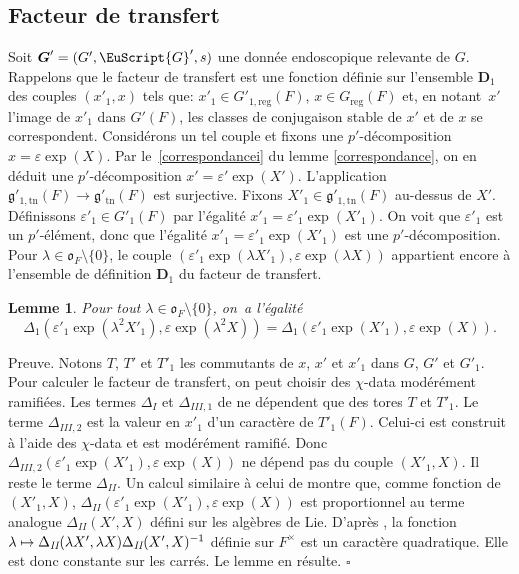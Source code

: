 \documentclass[JEP,XML,SOM,Unicode,francais]{cedram}
\let\mathcal \EuScript
\let\epsilon\varepsilon
\newcommand\mto{\mathchoice{\longmapsto}{\mapsto}{\mapsto}{\mapsto}}
\newcommand{\frg}{\mathfrak{g}}
\newcommand{\fro}{\mathfrak{o}}
\newcommand{\reg}{\mathrm{reg}}
\newcommand{\tn}{\mathrm{tn}}
\newcommand{\bD}{\boldsymbol{D}}
\newcommand{\bG}{\boldsymbol{G}}
\newcommand{\cG}{\mathcal{G}}
\theoremstyle{plain}
\newtheorem*{lem*}{Lemme}
\theoremstyle{definition}
\begin{document}
\subsection{Facteur de transfert}\label{facteurdetransfert}
Soit $\bG'=(G',\cG',s)$ une donnée endoscopique relevante de $G$. Rappelons que le facteur de transfert est une fonction définie sur l'ensemble $\bD_{1}$ des couples $(x'_{1},x)$ tels que: $x'_{1}\in G'_{1,\reg}(F)$, $x\in G_{\reg}(F)$ et, en notant~$x'$ l'image de $x'_{1}$ dans $G'(F)$, les classes de conjugaison stable de $x'$ et de $x$ se correspondent. Considérons un tel couple et fixons une
$p'$-décomposition $x=\epsilon \exp(X)$. Par le~\eqref{correspondancei} du
lemme \ref{correspondance}, on en déduit une $p'$-décomposition $x'=\epsilon' \exp(X')$. L'application $\frg'_{1,\tn}(F)\to \frg'_{\tn}(F)$ est surjective. Fixons $X'_{1}\in \frg'_{1,\tn}(F)$ au-dessus de $X'$. Définissons $\epsilon'_{1}\in G'_{1}(F)$ par l'égalité $x'_{1}=\epsilon'_{1}\exp(X'_{1})$. On voit que $\epsilon'_{1}$ est un $p'$-élément, donc que l'égalité $x'_{1}=\epsilon'_{1}\exp(X'_{1})$ est une $p'$-décomposition. Pour $\lambda\in \fro_{F}\setminus\{0\}$, le couple $(\epsilon'_{1}\exp(\lambda X'_{1}),\epsilon \exp(\lambda X))$ appartient encore à l'ensemble de définition $\bD_{1}$ du facteur de transfert.

\begin{lem*}
Pour tout $\lambda\in \fro_{F}\setminus\{0\}$, on~a l'égalité
\[
\Delta_{1}(\epsilon'_{1}\exp(\lambda^2 X'_{1}),\epsilon \exp(\lambda^2 X))=\Delta_{1}(\epsilon'_{1}\exp( X'_{1}),\epsilon \exp( X)).
\]
\end{lem*}

Preuve. Notons $T$, $T'$ et $T'_{1}$ les commutants de $x$, $x'$ et $x'_{1}$ dans $G$, $G'$ et $G'_{1}$. Pour calculer le facteur de transfert, on peut choisir des $\chi$-data modérément ramifiées. Les termes $\Delta_{I}$ et $\Delta_{\textit{III},1}$ de \cite{LS} ne dépendent que des tores $T$ et $T'_{1}$. Le terme $\Delta_{\textit{III},2}$ est la valeur en $x'_{1}$ d'un caractère de $T'_{1}(F)$. Celui-ci est construit à l'aide des $\chi$\nobreakdash-data et est modérément ramifié. Donc $\Delta_{\textit{III},2}(\epsilon'_{1}\exp( X'_{1}),\epsilon \exp( X))$ ne dépend pas du couple $(X'_{1},X)$. Il reste le terme $\Delta_{\textit{II}}$. Un calcul similaire à celui de \cite[Lem.\, 10.3]{W4} montre que, comme fonction de $(X'_{1},X)$, $\Delta_{\textit{II}}(\epsilon'_{1}\exp( X'_{1}),\epsilon \exp( X))$ est proportionnel au terme analogue $\Delta_{\textit{II}}(X',X)$ défini sur les algèbres de Lie. D'après \cite[Lem.\,3.2.1]{F}, la fonction $\lambda\mto \Delta_{\textit{II}}(\lambda X',\lambda X)\Delta_{\textit{II}}(X',X)^{-1}$ définie sur $F^{\times}$ est un caractère quadratique. Elle est donc constante sur les carrés. Le lemme en résulte. $\square$
\end{document}
